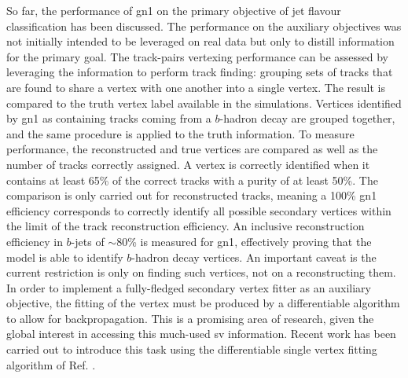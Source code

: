 So far, the performance of \gls{gn1} on the primary objective of jet flavour classification has been discussed. The performance on the auxiliary objectives was not initially intended to be leveraged on real data but only to distill information for the primary goal. The track-pairs vertexing performance can be assessed by leveraging the information to perform track finding: grouping sets of tracks that are found to share a vertex with one another into a single vertex. The result is compared to the truth vertex label available in the simulations. Vertices identified by \gls{gn1} as containing tracks coming from a $b$-hadron decay are grouped together, and the same procedure is applied to the truth information. To measure performance, the reconstructed and true vertices are compared as well as the number of tracks correctly assigned. A vertex is correctly identified when it contains at least 65\% of the correct tracks with a purity of at least 50\%. The comparison is only carried out for reconstructed tracks, meaning a 100\% \gls{gn1} efficiency corresponds to correctly identify all possible secondary vertices within the limit of the track reconstruction efficiency. An inclusive reconstruction efficiency in $b$-jets of $\sim$80\% is measured for \gls{gn1}, effectively proving that the model is able to identify $b$-hadron decay vertices. An important caveat is the current restriction is only on finding such vertices, not on a reconstructing them. In order to implement a fully-fledged secondary vertex fitter as an auxiliary objective, the fitting of the vertex must be produced by a differentiable algorithm to allow for backpropagation. This is a promising area of research, given the global interest in accessing this much-used \gls{sv} information. Recent work has been carried out to introduce this task using the differentiable single vertex fitting algorithm of Ref. \cite{smith2023differentiable}. \\

